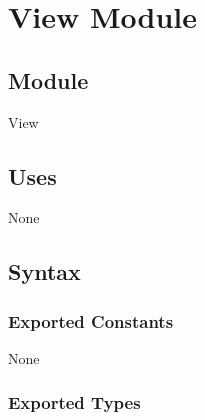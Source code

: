 \documentclass[12pt]{article}
\begin{document}



\newpage

\section* {View Module}

\subsection*{Module}

View

\subsection* {Uses}

None

\subsection* {Syntax}

\subsubsection* {Exported Constants}

None

\subsubsection* {Exported Types}
\end{document}
